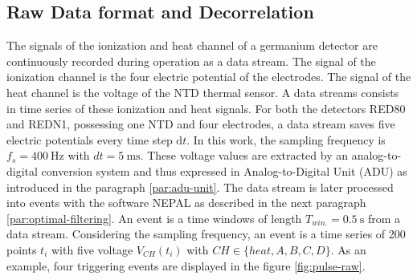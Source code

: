\subsection{Raw Data format and Decorrelation}
\label{par:data-format}

The signals of the ionization and heat channel of a germanium detector are continuously recorded during operation as a data stream. The signal of the ionization channel is the four electric potential of the electrodes. The signal of the heat channel is the voltage of the NTD thermal sensor. A data streams consists in time series of these ionization and heat signals. For both the detectors RED80 and REDN1, possessing one NTD and four electrodes, a data stream saves five electric potentials every time step $\mathrm{d}t$. In this work, the sampling frequency is $f_s = \SI{400}{\Hz}$ with $dt = \SI{5}{\milli\s}$. These voltage values are extracted by an analog-to-digital conversion system and thus expressed in Analog-to-Digital Unit (ADU) as introduced in the paragraph \ref{par:adu-unit}. The data stream is later processed into events with the software NEPAL as described in the next paragraph \ref{par:optimal-filtering}. An event is a time windows of length $T_{win.} = \SI{0.5}{\s}$ from a data stream. Considering the sampling frequency, an event is a time series of 200 points $t_i$ with five voltage $V_{CH}(t_i)$ with $CH \in \{ heat, A, B, C, D \}$. As an example, four triggering events are displayed in the figure \ref{fig:pulse-raw}.

